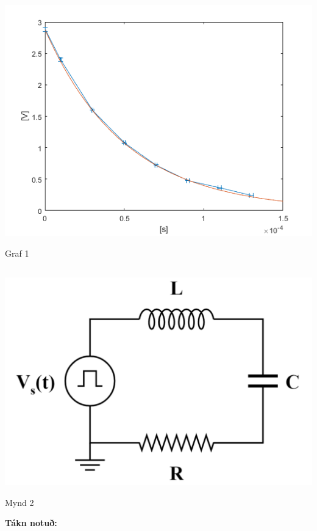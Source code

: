 \documentclass[12pt]{article}
\begin{document}
\begin{center}
    \includegraphics[scale=0.7]{data_01}

	Graf 1
\end{center}

\subsection{}

\begin{center}
    \includegraphics[scale=0.4]{mynd2}
    
    Mynd 2

\end{center}

\bigskip

\textbf{Tákn notuð:}
\end{document}
